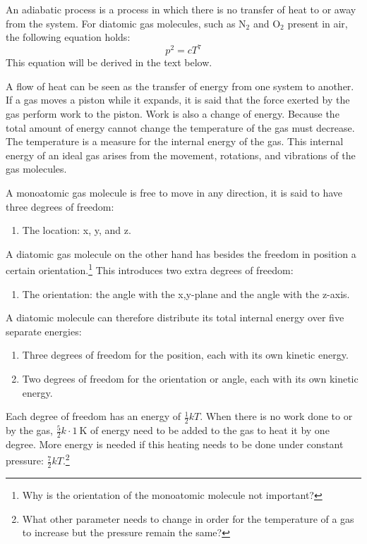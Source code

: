\documentclass[12pt,a4paper]{article}
\numberwithin{equation}{section}
\numberwithin{figure}{section}
\numberwithin{table}{section}
\begin{document}
An adiabatic process is a process in which there is no transfer of heat to or away from the system. For diatomic gas molecules, such as N$_2$ and O$_2$ present in air, the following equation holds:
\begin{equation}
p^2=cT^7
\end{equation}
This equation will be derived in the text below.

A flow of heat can be seen as the transfer of energy from one system to another. If a gas moves a piston while it expands, it is said that the force exerted by the gas perform work to the piston. Work is also a change of energy. Because the total amount of energy cannot change the temperature of the gas must decrease. The temperature is a measure for the internal energy of the gas. This internal energy of an ideal gas arises from the movement, rotations, and vibrations of the gas molecules.

A monoatomic gas molecule is free to move in any direction, it is said to have three degrees of freedom:
\begin{enumerate}[-]
\item The location: x, y, and z.
\end{enumerate}
A diatomic gas molecule on the other hand has besides the freedom in position a certain orientation.\footnote{Why is the orientation of the monoatomic molecule not important?} This introduces two extra degrees of freedom:
\begin{enumerate}[-]
\item The orientation: the angle with the x,y-plane and the angle with the z-axis.
\end{enumerate}
A diatomic molecule can therefore distribute its total internal energy over five separate energies:
\begin{enumerate}[-]
\item Three degrees of freedom for the position, each with its own kinetic energy.
\item Two degrees of freedom for the orientation or angle, each with its own kinetic energy.
\end{enumerate}
Each degree of freedom has an energy of $\frac{1}{2}kT$. When there is no work done to or by the gas, $\frac{5}{2}k\cdot1~\mbox{K}$ of energy need to be added to the gas to heat it by one degree. More energy is needed if this heating needs to be done under constant pressure: $\frac{7}{2}kT$.\footnote{What other parameter needs to change in order for the temperature of a gas to increase but the pressure remain the same?}
\end{document}
